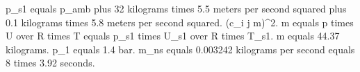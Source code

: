 p_s1 equals p_amb plus 32 kilograms times 5.5 meters per second squared plus 0.1 kilograms times 5.8 meters per second squared. (c_i j m)^2. 
m equals p times U over R times T equals p_s1 times U_s1 over R times T_s1.
m equals 44.37 kilograms.
p_1 equals 1.4 bar.
m_ns equals 0.003242 kilograms per second equals 8 times 3.92 seconds.